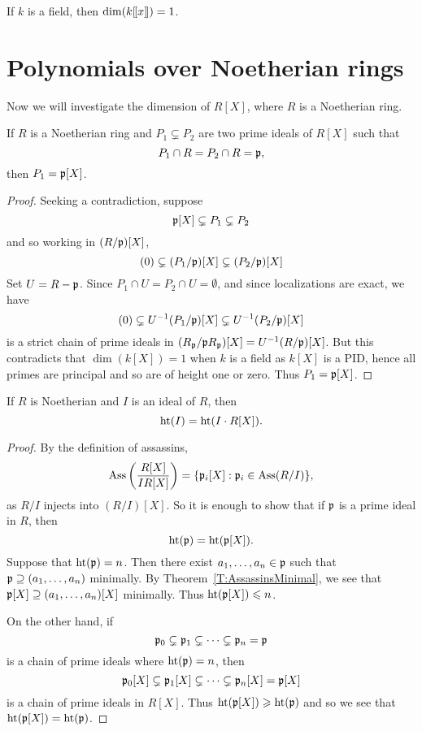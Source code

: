 \documentclass{ximera}
\begin{document}
\begin{example}
  If $k$ is a field, then $\dim(k[\hspace{-0.25ex}[ x ]\hspace{-0.25ex}]) = 1$.
\end{example}


\section{Polynomials over Noetherian rings}

Now we will investigate the dimension of $R[X]$, where $R$ is a
Noetherian ring.


\begin{lemma}\label{L:FT1}
  If $R$ is a Noetherian ring and $P_1\subsetneq P_2$ are two prime
  ideals of $R[X]$ such that
  \[
  P_1\cap R = P_2\cap R = \mathfrak{p},
  \]
  then $P_1 = \mathfrak{p}[X]$.
\end{lemma}

\begin{proof}
  Seeking a contradiction, suppose 
  \[
  \mathfrak{p}[X]\subsetneq P_1\subsetneq P_2 
  \]
  and so working in $(R/\mathfrak{p})[X]$,  
  \[
  (0) \subsetneq (P_1/\mathfrak{p})[X] \subsetneq (P_2/\mathfrak{p})[X]
  \]
  Set $U = R-\mathfrak{p}$.  Since $P_1 \cap U = P_2 \cap U = \emptyset$, and
  since localizations are exact, we have
  \[
  (0) \subsetneq U^{-1}(P_1/\mathfrak{p})[X] \subsetneq U^{-1}(P_2/\mathfrak{p})[X]
  \]
  is a strict chain of prime ideals in $(R_{\mathfrak{p}}/\mathfrak{p} R_{\mathfrak{p}})[X] =
  U^{-1}(R/\mathfrak{p})[X]$.  But this contradicts that $\dim(k[X]) = 1$ when
  $k$ is a field as $k[X]$ is a PID, hence all primes are principal
  and so are of height one or zero.  Thus $P_1 = \mathfrak{p}[X]$.
\end{proof}


\begin{lemma}\label{L:FT2}
  If $R$ is Noetherian and $I$ is an ideal of $R$, then
  \[
  \operatorname{ht}(I) = \operatorname{ht}(I\cdot R[X]).
  \]
  \begin{proof}
    By the definition of assassins,
    \[
    \operatorname{Ass}\left(\frac{R[X]}{IR[X]}\right) = \{\mathfrak{p}_i[X]: \mathfrak{p}_i\in\operatorname{Ass}(R/I)\},
    \]
    as $R/I$ injects into $(R/I) [X]$. So it is enough to show that if
    $\mathfrak{p}$ is a prime ideal in $R$, then
    \[
    \operatorname{ht}(\mathfrak{p}) = \operatorname{ht}(\mathfrak{p}[X]).
    \]
    Suppose that $\operatorname{ht}(\mathfrak{p}) = n$. Then there exist $a_1,\dots,a_n\in \mathfrak{p}$
    such that $\mathfrak{p}\supseteq(a_1,\dots,a_n)$ minimally. By
    Theorem~\ref{T:AssassinsMinimal}, we see that
    $\mathfrak{p}[X]\supseteq(a_1,\dots,a_n)[X]$ minimally. Thus $\operatorname{ht}(\mathfrak{p}[X])\leqslant n$.
    
    On the other hand, if 
    \[
    \mathfrak{p}_0 \subsetneq \mathfrak{p}_1 \subsetneq \cdots \subsetneq \mathfrak{p}_n = \mathfrak{p}
    \] 
    is a chain of prime ideals where $\operatorname{ht}(\mathfrak{p}) = n$, then 
    \[
    \mathfrak{p}_0[X] \subsetneq \mathfrak{p}_1[X] \subsetneq \cdots \subsetneq \mathfrak{p}_n[X] = \mathfrak{p}[X]
    \]
    is a chain of prime ideals in $R[X]$. Thus $\operatorname{ht}(\mathfrak{p}[X])\geqslant \operatorname{ht}(\mathfrak{p})$
    and so we see that $\operatorname{ht}(\mathfrak{p}[X]) = \operatorname{ht}(\mathfrak{p})$.
\end{proof}
\end{lemma}
\end{document}
